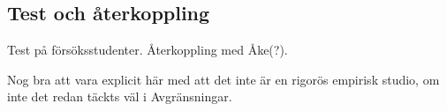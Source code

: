 \begin{binge}
  \section{Test och återkoppling}


  Test på försöksstudenter. Återkoppling med Åke(?).

  Nog bra att vara explicit här med att det inte är en rigorös empirisk
  studio, om inte det redan täckts väl i Avgränsningar.

\end{binge}
